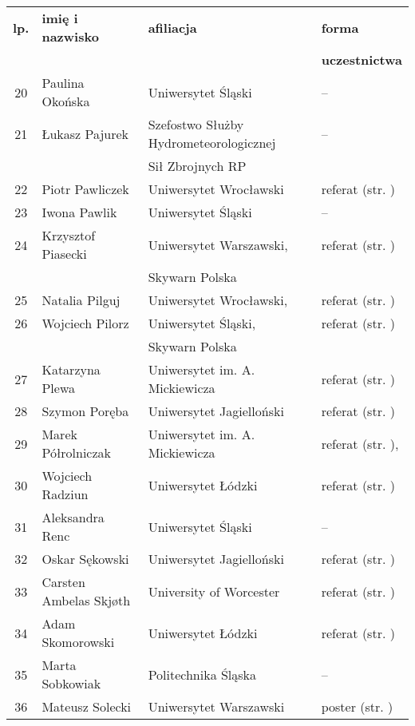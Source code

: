 \documentclass[12pt,oneside]{book}
\begin{document}
\normalsize
\begin{tabular}{||c|l|l|l||}
\hline
\hline
\textbf{lp.} & \textbf{imię i nazwisko} & \textbf{afiliacja} & \textbf{forma}\\
 &  &  & \textbf{uczestnictwa}\\
\hline
\hline
\hline
20	 & Paulina Okońska & Uniwersytet Śląski & -- \\\hline
21 	 & Łukasz Pajurek & Szefostwo Służby Hydrometeorologicznej & -- \\
	 &  & Sił Zbrojnych RP &  \\\hline
22 	 & Piotr Pawliczek & Uniwersytet Wrocławski & referat (str. \pageref{pawliczek})\\\hline
23 	 & Iwona Pawlik & Uniwersytet Śląski & -- \\\hline
24 	 & Krzysztof Piasecki & Uniwersytet Warszawski, & referat (str. \pageref{piasecki})\\
		 &  & Skywarn Polska &  \\\hline
25     & Natalia Pilguj & Uniwersytet Wrocławski, & referat (str. \pageref{pilguj})\\\hline
26	 & Wojciech Pilorz & Uniwersytet Śląski, & referat (str. \pageref{piasecki})\\
	 &  & Skywarn Polska &  \\\hline
27  	 & Katarzyna Plewa & Uniwersytet im. A. Mickiewicza & referat  (str. \pageref{plewa})\\\hline
28	 & Szymon Poręba & Uniwersytet Jagielloński & referat (str. \pageref{poreba}) \\\hline
29	 & Marek Półrolniczak & Uniwersytet im. A. Mickiewicza & referat (str. \pageref{kendzierski}), \pageref{kolendowicz} \\\hline
30   & Wojciech Radziun & Uniwersytet Łódzki & referat (str. \pageref{radziun}) \\\hline
31 	 & Aleksandra Renc & Uniwersytet Śląski & -- \\\hline
32	 & Oskar Sękowski & Uniwersytet Jagielloński & referat (str. \pageref{sekowski}) \\\hline
33	 & Carsten Ambelas Skjøth & University of Worcester & referat (str. \pageref{bilinska}) \\\hline
34	 & Adam Skomorowski & Uniwersytet Łódzki & referat (str. \pageref{skomorowski}) \\\hline	
35	 & Marta Sobkowiak & Politechnika Śląska & -- \\\hline
36	 & Mateusz Solecki & Uniwersytet Warszawski & poster (str. \pageref{solecki}) \\\hline	

\end{tabular}
\end{document}
